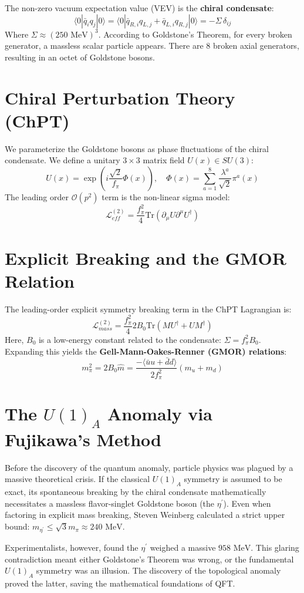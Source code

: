 \documentclass[12pt, a4paper]{article}
\begin{document}
The non-zero vacuum expectation value (VEV) is the \textbf{chiral condensate}:
\[
\langle 0 | \bar{q}_i q_j | 0 \rangle = \langle 0 | \bar{q}_{R,i} q_{L,j} + \bar{q}_{L,i} q_{R,j} | 0 \rangle = - \Sigma \, \delta_{ij}
\]
Where $\Sigma \approx (250 \text{ MeV})^3$. According to Goldstone's Theorem, for every broken generator, a massless scalar particle appears. There are $8$ broken axial generators, resulting in an octet of Goldstone bosons.

\section{Chiral Perturbation Theory (ChPT)}

We parameterize the Goldstone bosons as phase fluctuations of the chiral condensate. We define a unitary $3 \times 3$ matrix field $U(x) \in SU(3)$:
\[
U(x) = \exp\left( i \frac{\sqrt{2}}{f_\pi} \Phi(x) \right), \quad \Phi(x) = \sum_{a=1}^8 \frac{\lambda^a}{\sqrt{2}} \pi^a(x)
\]
The leading order $\mathcal{O}(p^2)$ term is the non-linear sigma model:
\[
\mathcal{L}_{eff}^{(2)} = \frac{f_\pi^2}{4} \text{Tr}\left( \partial_\mu U \partial^\mu U^\dagger \right)
\]

\section{Explicit Breaking and the GMOR Relation}

The leading-order explicit symmetry breaking term in the ChPT Lagrangian is:
\[
\mathcal{L}_{mass}^{(2)} = \frac{f_\pi^2}{4} 2B_0 \text{Tr}\left( M U^\dagger + U M^\dagger \right)
\]
Here, $B_0$ is a low-energy constant related to the condensate: $\Sigma = f_\pi^2 B_0$. Expanding this yields the \textbf{Gell-Mann-Oakes-Renner (GMOR) relations}:
\[
m_\pi^2 = 2 B_0 \hat{m} = \frac{-\langle \bar{u}u + \bar{d}d \rangle}{2f_\pi^2} (m_u + m_d)
\]

\section{The $U(1)_A$ Anomaly via Fujikawa's Method}

\begin{tcolorbox}[colback=orange!5!white,colframe=orange!80!black,title=Historical Context: The $U(1)$ Problem]
Before the discovery of the quantum anomaly, particle physics was plagued by a massive theoretical crisis. If the classical $U(1)_A$ symmetry is assumed to be exact, its spontaneous breaking by the chiral condensate mathematically necessitates a massless flavor-singlet Goldstone boson (the $\eta^\prime$). Even when factoring in explicit mass breaking, Steven Weinberg calculated a strict upper bound: $m_{\eta^\prime} \le \sqrt{3} m_\pi \approx 240 \text{ MeV}$.

Experimentalists, however, found the $\eta^\prime$ weighed a massive $958 \text{ MeV}$. This glaring contradiction meant either Goldstone's Theorem was wrong, or the fundamental $U(1)_A$ symmetry was an illusion. The discovery of the topological anomaly proved the latter, saving the mathematical foundations of QFT.
\end{tcolorbox}
\end{document}
